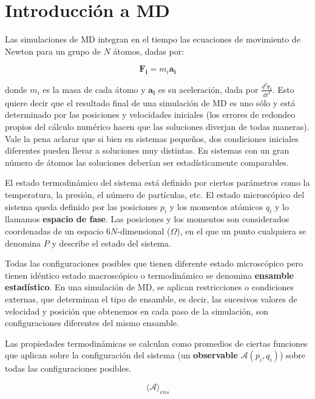 \section{Introducción a MD}
\label{S2_2}

Las simulaciones de MD integran en el tiempo las ecuaciones de movimiento de Newton para un grupo de $N$ átomos, dadas por:

\begin{equation}
\mathbf{F_{i}} = m_{i}\mathbf{a_{i}}
\end{equation}

donde $m_{i}$ es la masa de cada átomo y $\mathbf{a_{i}}$ es su aceleración, dada por $\frac{d^{2}\mathbf{r_{i}}}{dt^{2}}$. Esto quiere decir que el resultado final de una simulación de MD es uno sólo y está determinado por las posiciones y velocidades iniciales (los errores de redondeo propios del cálculo numérico hacen que las soluciones diverjan de todas maneras). Vale la pena aclarar que si bien en sistemas pequeños, dos condiciones iniciales diferentes pueden llevar a soluciones muy distintas. En sistemas con un gran número de átomos las soluciones deberían ser estadísticamente comparables.

El estado termodinámico del sistema está definido por ciertos parámetros como la temperatura, la presión, el número de partículas, etc. El estado microscópico del sistema queda definido por las posiciones $p_{i}$ y los momentos atómicos $q_{i}$ y lo llamamos \textbf{espacio de fase}. Las posiciones y los momentos son considerados coordenadas de un espacio $6N$-dimensional ($\Omega$), en el que un punto cualquiera se denomina $P$ y describe el estado del sistema. 

Todas las configuraciones posibles que tienen diferente estado microscópico pero tienen idéntico estado macroscópico o termodinámico se denomina \textbf{ensamble estadístico}. En una simulación de MD, se aplican restricciones o condiciones externas, que determinan el tipo de ensamble, es decir, las sucesivos valores de velocidad y posición que obtenemos en cada paso de la simulación, son configuraciones diferentes del mismo ensamble.

Las propiedades termodinámicas se calculan como promedios de ciertas funciones que aplican sobre la configuración del sistema (un \textbf{observable} $\mathbf{\mathcal{A}}(p_{i},q_{i})$) sobre todas las configuraciones posibles.

\begin{equation}
\langle \mathbf{\mathcal{A}} \rangle _{ens}
\end{equation}


